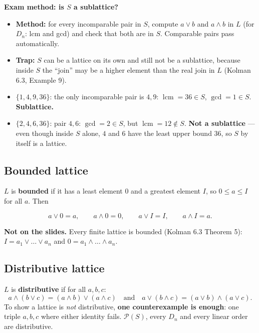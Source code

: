 \documentclass{fkt-notes}
\DeclareMathOperator{\lcm}{lcm}
\newcommand{\notslides}[1]{\par\noindent\textbf{Not on the slides.} #1\par}
\theoremstyle{definition}
\begin{document}
\textbf{Exam method: is $S$ a sublattice?}
\begin{itemize}[nosep]
  \item \textbf{Method:} for every incomparable pair in $S$, compute
        $a \vee b$ and $a \wedge b$ in $L$ (for $D_n$: lcm and gcd) and
        check that both are in $S$. Comparable pairs pass automatically.
  \item \textbf{Trap:} $S$ can be a lattice on its own and still not
        be a sublattice, because inside $S$ the ``join'' may be a
        higher element than the real join in $L$ (Kolman 6.3, Example 9).
\end{itemize}

\begin{example}
  \leavevmode
  \begin{itemize}[nosep]
    \item $\{1, 4, 9, 36\}$: the only incomparable pair is $4, 9$:
          $\lcm = 36 \in S$, $\gcd = 1 \in S$. \textbf{Sublattice.}
    \item $\{2, 4, 6, 36\}$: pair $4, 6$: $\gcd = 2 \in S$, but
          $\lcm = 12 \notin S$. \textbf{Not a sublattice} --- even
          though inside $S$ alone, $4$ and $6$ have the least upper
          bound $36$, so $S$ by itself is a lattice.
  \end{itemize}
\end{example}

\subsection{Bounded lattice}
%
$L$ is \textbf{bounded} if it has a least
element $0$ and a greatest element $I$, so $0\le a\le I$ for all $a$.
Then
\begin{rulepar}
  \[
    a\vee0=a,\qquad a\wedge0=0,\qquad a\vee I=I,\qquad a\wedge I=a.
  \]
\end{rulepar}
\notslides{Every finite lattice is bounded (Kolman 6.3 Theorem 5):
  $I=a_1\vee\dots\vee a_n$ and $0=a_1\wedge\dots\wedge a_n$.}

\subsection{Distributive lattice}
%
$L$ is \textbf{distributive} if for
all $a,b,c$:
\[
  a\wedge(b\vee c)=(a\wedge b)\vee(a\wedge c)
  \quad\text{and}\quad
  a\vee(b\wedge c)=(a\vee b)\wedge(a\vee c).
\]
To show a lattice is \emph{not} distributive, \textbf{one
  counterexample is enough}: one triple $a,b,c$ where either identity
fails. $\mathcal P(S)$, every $D_n$ and every linear order are distributive.
\end{document}
